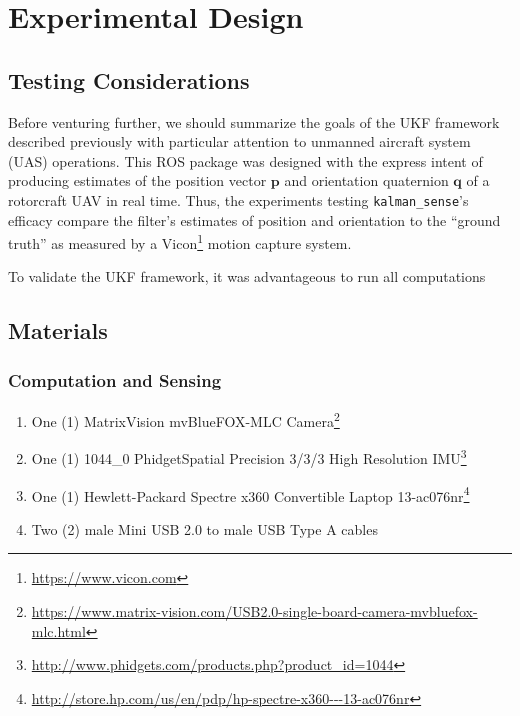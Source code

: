 \chapter{Experimental Design}

\section{Testing Considerations}

Before venturing further, we should summarize the goals of the UKF framework described previously with particular attention to unmanned aircraft system (UAS) operations. This ROS package was designed with the express intent of producing estimates of the position vector $\mathbf{p}$ and orientation quaternion $\mathbf{q}$ of a rotorcraft UAV in real time. Thus, the experiments testing \texttt{kalman\_sense}'s efficacy compare the filter's estimates of position and orientation to the ``ground truth'' as measured by a Vicon\footnote{\url{https://www.vicon.com}} motion capture system.

To validate the UKF framework, it was advantageous to run all computations 

\section{Materials}
\subsection{Computation and Sensing}
\begin{enumerate}
\item One (1) MatrixVision mvBlueFOX-MLC Camera\footnote{\url{https://www.matrix-vision.com/USB2.0-single-board-camera-mvbluefox-mlc.html}}
\item One (1) 1044\_0 PhidgetSpatial Precision 3/3/3 High Resolution IMU\footnote{\url{http://www.phidgets.com/products.php?product_id=1044}}
\item One (1) Hewlett-Packard Spectre x360 Convertible Laptop 13-ac076nr\footnote{\url{http://store.hp.com/us/en/pdp/hp-spectre-x360---13-ac076nr}}
\item Two (2) male Mini USB 2.0 to male USB Type A cables
\end{enumerate}

